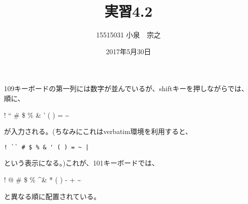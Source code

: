 \documentclass[12pt,a4j]{jarticle}
\title{実習4.2}
\author{15515031 小泉　宗之}
\date{2017年5月30日}
\begin{document}
\maketitle
109キーボードの第一列には数字が並んでいるが、shiftキーを押しながらでは、順に、
\begin{center}
! `` \# \$ \% \& ' ( ) = \textasciitilde \textbar
\end{center}
が入力される。(ちなみにこれはverbatim環境を利用すると、
\begin{verbatim}
! `` # $ % & ' ( ) = ~ |
\end{verbatim}
という表示になる。)これが、101キーボードでは、
\begin{center}
! @ \# \$ \% \textasciicircum \& * ( ) - + \textbar \textasciitilde
\end{center}
と異なる順に配置されている。
\end{document}
